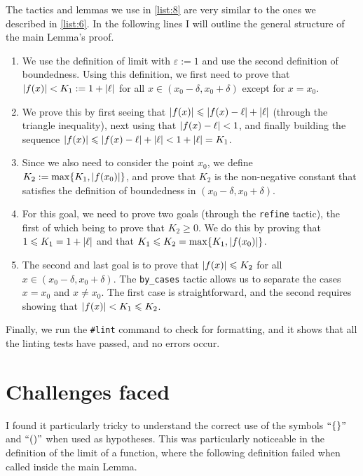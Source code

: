 \documentclass[a4paper,11pt]{article}
\theoremstyle{plain}
\begin{document}
	The tactics and lemmas we use in \cref{list:8} are very similar to the ones we described in \cref{list:6}. In the following lines I will outline the general structure of the main Lemma's proof.
	\begin{enumerate}
		\item We use the definition of limit with $\varepsilon:=1$ and use the second definition of boundedness. Using this definition, we first need to prove that $\abs{f(x)}<K_1:=1+\abs{\ell}$ for all $x\in(x_0-\delta, x_0+\delta)$ except for $x=x_0$.
		\item We prove this by first seeing that $\abs{f(x)}\leqslant \abs{f(x)-\ell}+\abs{\ell}$ (through the triangle inequality), next using that $\abs{f(x)-\ell}<1$, and finally building the sequence $\abs{f(x)}\leqslant\abs{f(x)-\ell}+\abs{\ell}<1+\abs{\ell}=K_1$.
		\item Since we also need to consider the point $x_0$, we define $K_2:=\max\{K_1, \abs{f(x_0)}\}$, and prove that $K_2$ is the non-negative constant that satisfies the definition of boundedness in $(x_0-\delta, x_0+\delta)$.
		\item For this goal, we need to prove two goals (through the \lstinline|refine| tactic), the first of which being to prove that $K_2\geqslant 0$. We do this by proving that $1\leqslant K_1=1+\abs{\ell}$ and that $K_1\leqslant K_2=\max\{K_1, \abs{f(x_0)}\}$.
		\item The second and last goal is to prove that $\abs{f(x)}\leqslant K_2$ for all $x\in(x_0-\delta, x_0+\delta)$. The \lstinline|by_cases| tactic allows us to separate the cases $x=x_0$ and $x\neq x_0$. The first case is straightforward, and the second requires showing that $\abs{f(x)}<K_1\leqslant K_2$.
	\end{enumerate}
	
	Finally, we run the \lstinline|#lint| command to check for formatting, and it shows that all the linting tests have passed, and no errors occur.
	
	\section{Challenges faced}\label{sec:challenges}
	
		I found it particularly tricky to understand the correct use of the symbols $``\{\}"$ and $``()"$ when used as hypotheses. This was particularly noticeable in the definition of the limit of a function, where the following definition failed when called inside the main Lemma.\\
		
\end{document}
